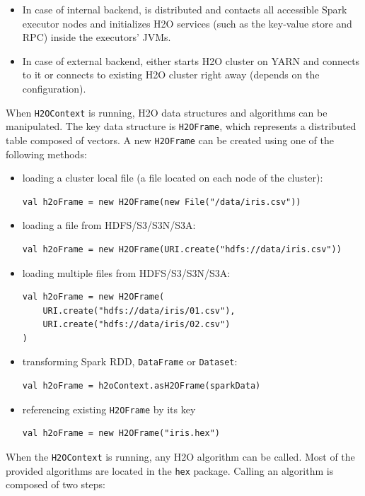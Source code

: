 \documentclass{standalone}
\begin{document}
\begin{itemize}
 \item In case of internal backend, is distributed and contacts all accessible Spark executor nodes and initializes H2O services (such as the key-value store and RPC) inside the executors' JVMs.
 \item In case of external backend, either starts H2O cluster on YARN and connects to it or connects to existing H2O cluster right away (depends on the configuration).
\end{itemize}

\newpage
When \texttt{H2OContext} is running, H2O data structures and algorithms can be manipulated. The key data structure is \texttt{H2OFrame}, which represents a distributed table composed of vectors. A new \texttt{H2OFrame} can be created using one of the following methods:
\begin{itemize}
	\item loading a cluster local file (a file located on each node of the cluster):
\begin{lstlisting}[style=Scala]
val h2oFrame = new H2OFrame(new File("/data/iris.csv"))
\end{lstlisting}
	\item loading a file from HDFS/S3/S3N/S3A:
\begin{lstlisting}[style=Scala]
val h2oFrame = new H2OFrame(URI.create("hdfs://data/iris.csv"))
\end{lstlisting}
	\item loading multiple files from HDFS/S3/S3N/S3A:
\begin{lstlisting}[style=Scala]
val h2oFrame = new H2OFrame(
    URI.create("hdfs://data/iris/01.csv"),
    URI.create("hdfs://data/iris/02.csv")
)
\end{lstlisting}
	\item transforming Spark RDD, \texttt{DataFrame} or \texttt{Dataset}:
\begin{lstlisting}[style=Scala]
val h2oFrame = h2oContext.asH2OFrame(sparkData)
\end{lstlisting}
	\item referencing existing \texttt{H2OFrame} by its key
\begin{lstlisting}[style=Scala]
val h2oFrame = new H2OFrame("iris.hex")
\end{lstlisting}		
\end{itemize}


\pagebreak
When the \texttt{H2OContext} is running, any H2O algorithm can be called. Most of the provided algorithms are located in the \texttt{hex} package. Calling an algorithm is composed of two steps:
\end{document}
